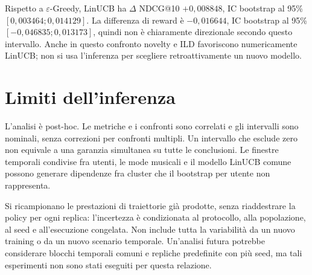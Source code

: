 
Rispetto a $\varepsilon$-Greedy, LinUCB ha $\Delta$ NDCG@10 $+0{,}008848$, IC bootstrap al 95\% $[0{,}003464;0{,}014129]$. La differenza di reward è $-0{,}016644$, IC bootstrap al 95\% $[-0{,}046835;0{,}013173]$, quindi non è chiaramente direzionale secondo questo intervallo. Anche in questo confronto novelty e ILD favoriscono numericamente LinUCB; non si usa l'inferenza per scegliere retroattivamente un nuovo modello.

\section{Limiti dell'inferenza}
L'analisi è post-hoc. Le metriche e i confronti sono correlati e gli intervalli sono nominali, senza correzioni per confronti multipli. Un intervallo che esclude zero non equivale a una garanzia simultanea su tutte le conclusioni. Le finestre temporali condivise fra utenti, le mode musicali e il modello LinUCB comune possono generare dipendenze fra cluster che il bootstrap per utente non rappresenta.

Si ricampionano le prestazioni di traiettorie già prodotte, senza riaddestrare la policy per ogni replica: l'incertezza è condizionata al protocollo, alla popolazione, al seed e all'esecuzione congelata. Non include tutta la variabilità da un nuovo training o da un nuovo scenario temporale. Un'analisi futura potrebbe considerare blocchi temporali comuni e repliche predefinite con più seed, ma tali esperimenti non sono stati eseguiti per questa relazione.
